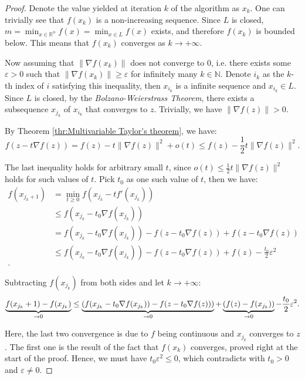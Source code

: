 \begin{proof}
  Denote the value yielded at iteration \( k \) of the algorithm as \( x_{k} \).
  One can trivially see that \( f(x_{k}) \) is a non-increasing
  sequence. Since \( L \) is closed, \( m = \min_{x \in \mathbb{R}^{n}} f(x) =
  \min_{x \in L} f(x) \) exists, and therefore \( f(x_{k}) \) is bounded below.
  This means that \( f(x_{k}) \) converges as \( k \to
  +\infty \).

  Now assuming that \( \|\nabla f(x_{k})\| \) does not converge to \( 0 \), i.e.
  there exists some \( \varepsilon > 0 \) such that \( \|\nabla f(x_{k})\| \ge
  \varepsilon \) for infinitely many \( k \in \mathbb{N} \). Denote \( i_{k} \)
  as the \( k \)-th index of \( i \) satisfying this inequality, then \(
  x_{i_{k}} \) is a infinite sequence and \( x_{i_{k}} \in L \). Since \( L \)
  is closed, by the \textit{Bolzano-Weierstrass Theorem}, there exists a
  subsequence \( x_{j_{k}} \) of \( x_{i_{k}} \) that converges to \( z \).
  Trivially, we have \( \|\nabla f(z)\| > 0 \).

  By Theorem \ref{thr:Multivariable Taylor's theorem}, we have:
  \[
    f(z - t \nabla f(z)) = f(z) - t\|\nabla f(z)\|^2 + o(t) \le f(z) -
    \frac{1}{2}t \|\nabla f(z)\|^2
  .\] 

  The last inequality holds for arbitrary small \( t \), since \( o(t) \le
  \frac{1}{2}t \|\nabla f(z)\|^2 \) holds for such values of \( t \). Pick \(
  t_{0} \) as one such value of \( t \), then we have:
  \begin{align*}
    f(x_{j_{k} + 1}) &= \min_{t \ge 0} f(x_{j_{k}} - tf'(x_{j_{k}}))\\
    &\le f(x_{j_{k}}-t_{0}\nabla f(x_{j_{k}})) \\
    &= f(x_{j_{k}}-t_{0}\nabla f(x_{j_{k}})) - f(z - t_{0}\nabla f(z)) + f(z -
    t_{0}\nabla f(z)) \\
    &\le  f(x_{j_{k}}-t_{0}\nabla f(x_{j_{k}})) - f(z - t_{0}\nabla f(z)) + f(z) -
    \frac{t_{0}}{2}\varepsilon ^2 \\
  .\end{align*}

  Subtracting \( f(x_{j_{k}}) \) from both sides and let \( k \to +\infty \):
  \[
    \underbrace{f(x_{j_{k}}+1) - f(x_{j_{k}})}_{\to 0}
     \le 
     \underbrace{\left( 
    f(x_{j_{k}}-t_{0}\nabla f(x_{j_{k}})) - f(z - t_{0}\nabla f(z))
\right)}_{\to 0}
+ \underbrace{(f(z) - f(x_{j_{k}}))}_{\to 0} -
    \frac{t_{0}}{2}\varepsilon ^2 \\
  .\] 

  Here, the last two convergence is due to \( f \) being continuous and \(
  x_{j_{k}} \) converges to \( z \). The first one is the result of the fact
  that \( f(x_{k}) \) converges, proved right at the start of the proof.
  Hence, we must have \( t_{0}\varepsilon ^2 \le 0 \), which contradicts with \(
  t_{0} > 0\) and \( \varepsilon \neq 0 \).
\end{proof}

